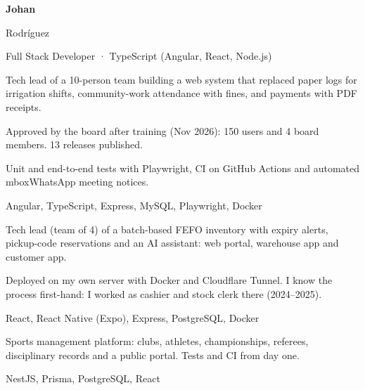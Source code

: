 \documentclass[9pt]{extarticle}
\begin{document}
\hspace{1.2cm}%
\begin{minipage}[t]{\anchoPrincipal}
\vspace{0pt}
\color{tinta}
{\bfseries\fontsize{34}{36}\selectfont Johan\par Rodríguez\par}
\vspace{6pt}
{\color{suave}\fontsize{11.5}{14}\selectfont Full Stack Developer · TypeScript (Angular, React, Node.js)\par}

\begin{vinetas}
  \item Tech lead of a 10-person team building a web system that replaced paper logs for irrigation shifts, community-work attendance with fines, and payments with PDF receipts.
  \item Approved by the board after training (Nov 2026): 150 users and 4 board members. 13 releases published.
  \item Unit and end-to-end tests with Playwright, CI on GitHub Actions and automated mbox{WhatsApp} meeting notices.
\end{vinetas}
{\small\color{suave}Angular, TypeScript, Express, MySQL, Playwright, Docker}\par
\vspace{6pt}
\begin{vinetas}
  \item Tech lead (team of 4) of a batch-based FEFO inventory with expiry alerts, pickup-code reservations and an AI assistant: web portal, warehouse app and customer app.
  \item Deployed on my own server with Docker and Cloudflare Tunnel. I know the process first-hand: I worked as cashier and stock clerk there (2024–2025).
\end{vinetas}
{\small\color{suave}React, React Native (Expo), Express, PostgreSQL, Docker}\par
\vspace{6pt}
\begin{vinetas}
  \item Sports management platform: clubs, athletes, championships, referees, disciplinary records and a public portal. Tests and CI from day one.
\end{vinetas}
{\small\color{suave}NestJS, Prisma, PostgreSQL, React}\par


\end{minipage}
\end{document}
